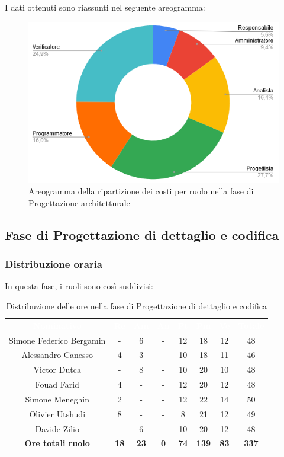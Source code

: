 I dati ottenuti sono riassunti nel seguente areogramma:
\begin{figure}[H]
\centering
\includegraphics[scale=0.60]{img/grafici/torta_fase_prog_architetturale.png}
\caption{Areogramma della ripartizione dei costi per ruolo nella fase di Progettazione architetturale}
\end{figure}
 
 
\subsection{Fase di Progettazione di dettaglio e codifica}
\subsubsection{Distribuzione oraria}
In questa fase, i ruoli sono così suddivisi:
\begin{table}[H]
\centering\renewcommand{\arraystretch}{1.5}
\caption{Distribuzione delle ore nella fase di Progettazione di dettaglio e codifica}
\vspace{0.2cm}
\begin{tabular}{ c c c c c c c c }
\rowcolor{redafk}
\textcolor{white}{\textbf{Nominativo}} & \textcolor{white}{\textbf{Re}} &
\textcolor{white}{\textbf{Am}} & \textcolor{white}{\textbf{An}} &
\textcolor{white}{\textbf{Pt}} & \textcolor{white}{\textbf{Pm}} &
\textcolor{white}{\textbf{Ve}} & \textcolor{white}{\textbf{Totale}} \\
Simone Federico Bergamin & - & 6 & - & 12 & 18 & 12 & 48 \\
Alessandro Canesso & 4 & 3 & - & 10 & 18 & 11 & 46 \\
Victor Dutca & - & 8 & - & 10 & 20 & 10 & 48 \\
Fouad Farid & 4 & - & - & 12 & 20 & 12 & 48 \\
Simone Meneghin & 2 & - & - & 12 & 22 & 14 & 50 \\
Olivier Utshudi & 8 & - & - & 8 & 21 & 12 & 49 \\
Davide Zilio & - & 6 & - & 10 & 20 & 12 & 48 \\
\rowcolor{lastrowcolor}
\textbf{Ore totali ruolo} & \textbf{18} & \textbf{23} & \textbf{0} & \textbf{74} & \textbf{139} & \textbf{83} & \textbf{337} \\
\end{tabular}
\end{table}
 
